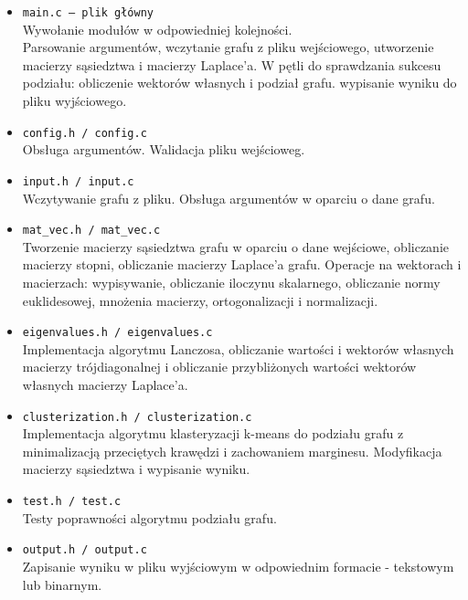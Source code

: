 \documentclass{article}
\begin{document}
    
    
    \begin{itemize}
        \item \texttt{main.c — plik główny} \\
        Wywołanie modułów w odpowiedniej kolejności. \\
        Parsowanie argumentów, wczytanie grafu z pliku wejściowego, utworzenie macierzy sąsiedztwa i macierzy Laplace'a.
        W pętli do sprawdzania sukcesu podziału: obliczenie wektorów własnych i podział grafu.
        wypisanie wyniku do pliku wyjściowego.
        \item \texttt{config.h / config.c} \\
        Obsługa argumentów. Walidacja pliku wejścioweg.
        \item \texttt{input.h / input.c} \\
        Wczytywanie grafu z pliku.
        Obsługa argumentów w oparciu o dane grafu.
        \item \texttt{mat\_vec.h / mat\_vec.c} \\
        Tworzenie macierzy sąsiedztwa grafu w oparciu o dane wejściowe, obliczanie macierzy stopni, obliczanie macierzy Laplace'a grafu.
        Operacje na wektorach i macierzach: wypisywanie, obliczanie iloczynu skalarnego, obliczanie normy euklidesowej, mnożenia macierzy, ortogonalizacji i normalizacji.
        \item \texttt{eigenvalues.h / eigenvalues.c} \\
        Implementacja algorytmu Lanczosa, obliczanie wartości i wektorów własnych macierzy trójdiagonalnej i obliczanie przybliżonych wartości wektorów własnych macierzy Laplace'a.
        \item \texttt{clusterization.h / clusterization.c} \\
        Implementacja algorytmu klasteryzacji k-means do podziału grafu z minimalizacją przeciętych krawędzi i zachowaniem marginesu. Modyfikacja macierzy sąsiedztwa i wypisanie wyniku.
        \item \texttt{test.h / test.c} \\
        Testy poprawności algorytmu podziału grafu.
        \item \texttt{output.h / output.c} \\
        Zapisanie wyniku w pliku wyjściowym w odpowiednim formacie - tekstowym lub binarnym.
    \end{itemize}
\end{document}
